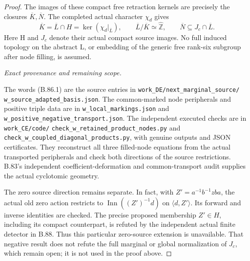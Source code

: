 \begin{proof}
The images of these compact free retraction kernels are precisely the
closures \(\overline K,\overline N\). The completed actual character
\(\chi_d\) gives
\[
 \overline K=\overline L\cap H
       =\ker(\chi_d|_{\overline L}),\qquad
 \overline L/\overline K\simeq\widehat{\mathbb Z},\qquad
 \overline N\subseteq J_c\cap\overline L .
\tag{B.86.12}
\]
Here H and \(J_c\) denote their actual compact source images.
No full induced topology on the abstract L, or embedding of the
generic free rank-six subgroup after node filling, is assumed.

\emph{Exact provenance and remaining scope.}\par
The words (B.86.1) are the source entries in
\texttt{work\_\allowbreak DE/next\_\allowbreak marginal\_\allowbreak source/}\allowbreak
\texttt{w\_\allowbreak source\_\allowbreak adapted\_\allowbreak basis.json}.
The common-marked node peripherals and positive triple data are in
\texttt{w\_\allowbreak local\_\allowbreak markings.json} and
\texttt{w\_\allowbreak positive\_\allowbreak negative\_\allowbreak transport.json}.
The independent executed checks are in
\texttt{work\_\allowbreak CE/code/}\allowbreak
\texttt{check\_\allowbreak w\_\allowbreak retained\_\allowbreak product\_\allowbreak nodes.py}
and
\texttt{check\_\allowbreak w\_\allowbreak coupled\_\allowbreak diagonal\_\allowbreak products.py},
with genuine outputs and JSON certificates. They reconstruct all three
filled-node equations from the actual transported peripherals and check
both directions of the source restrictions. B.83's independent
coefficient-deformation and common-transport audit supplies the actual
cyclotomic geometry.

The zero source direction remains separate. In fact, with
\(Z'=a^{-1}b^{-1}zba\), the actual old zero action restricts to
\(\operatorname{Inn}((Z')^{-1}d)\) on \(\langle d,Z'\rangle\).
Its forward and inverse identities are checked. The precise proposed
membership \(Z'\in H\), including its compact counterpart, is
refuted by the independent actual finite detector in B.88. Thus this
particular zero-source extension is unavailable. That negative result
does not refute the full marginal or global normalization of \(J_c\),
which remain open; it is not used in the proof above.
\end{proof}
